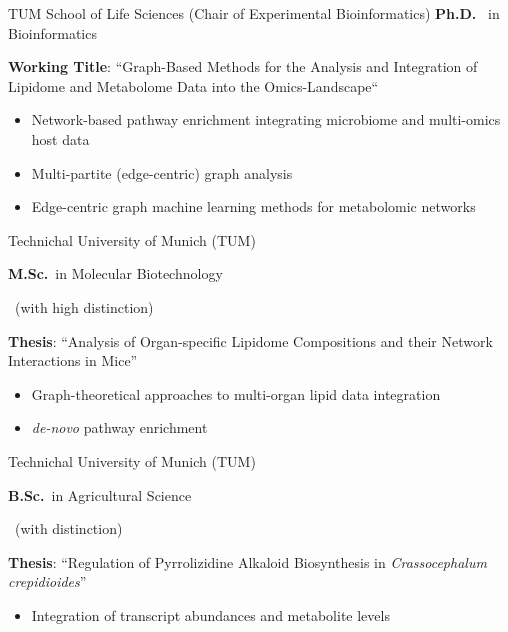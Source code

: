 {%
	TUM School of Life Sciences (Chair of Experimental Bioinformatics)%
}
{%
	\textbf{Ph.D.}~ in Bioinformatics%
}
{%
	\vspace{.1cm}
	\textbf{Working Title}: ``Graph-Based Methods for the Analysis and Integration of Lipidome and Metabolome Data into the Omics-Landscape``%
	\begin{itemize}
		\item Network-based pathway enrichment integrating microbiome and multi-omics host data
		\item Multi-partite (edge-centric) graph analysis
		\item Edge-centric graph machine learning methods for metabolomic networks
	\end{itemize}
}

{%
	Technichal University of Munich (TUM)%
}
{%
	\textbf{M.Sc.}~in Molecular Biotechnology
	\begin{footnotesize}
		~(with high distinction)
	\end{footnotesize}%
}
{%
	\vspace{.1cm}
	\textbf{Thesis}: ``Analysis of Organ-specific Lipidome Compositions and their Network Interactions in Mice''%
	\begin{itemize}
		\item Graph-theoretical approaches to multi-organ lipid data integration
		\item \textit{de-novo} pathway enrichment
	\end{itemize}
}

{%
	Technichal University of Munich (TUM)%
}
{%
	\textbf{B.Sc.}~in Agricultural Science%
	\begin{footnotesize}
		~(with distinction)
	\end{footnotesize}%
}
{%
	\vspace{.1cm}
	\textbf{Thesis}: ``Regulation of Pyrrolizidine Alkaloid Biosynthesis in \textit{Crassocephalum crepidioides}''%
	\begin{itemize}
		\item Integration of transcript abundances and metabolite levels
	\end{itemize}
}
